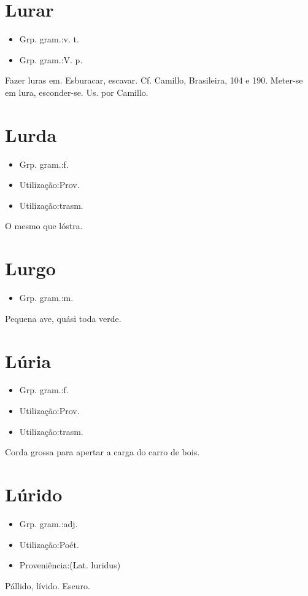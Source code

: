 \section{Lurar}
\begin{itemize}
\item {Grp. gram.:v. t.}
\end{itemize}
\begin{itemize}
\item {Grp. gram.:V. p.}
\end{itemize}
Fazer luras em.
Esburacar, escavar. Cf. Camillo, \textunderscore Brasileira\textunderscore , 104 e 190.
Meter-se em lura, esconder-se. Us. por Camillo.
\section{Lurda}
\begin{itemize}
\item {Grp. gram.:f.}
\end{itemize}
\begin{itemize}
\item {Utilização:Prov.}
\end{itemize}
\begin{itemize}
\item {Utilização:trasm.}
\end{itemize}
O mesmo que \textunderscore lóstra\textunderscore .
\section{Lurgo}
\begin{itemize}
\item {Grp. gram.:m.}
\end{itemize}
Pequena ave, quási toda verde.
\section{Lúria}
\begin{itemize}
\item {Grp. gram.:f.}
\end{itemize}
\begin{itemize}
\item {Utilização:Prov.}
\end{itemize}
\begin{itemize}
\item {Utilização:trasm.}
\end{itemize}
Corda grossa para apertar a carga do carro de bois.
\section{Lúrido}
\begin{itemize}
\item {Grp. gram.:adj.}
\end{itemize}
\begin{itemize}
\item {Utilização:Poét.}
\end{itemize}
\begin{itemize}
\item {Proveniência:(Lat. \textunderscore luridus\textunderscore )}
\end{itemize}
Pállido, lívido.
Escuro.
